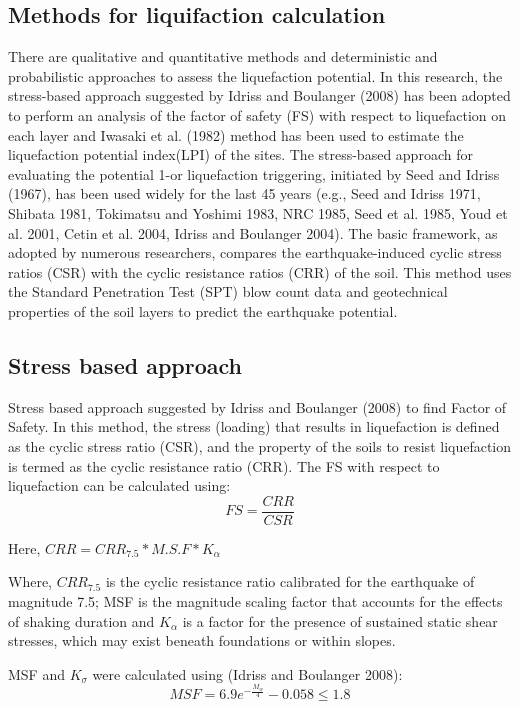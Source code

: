 \subsection{Methods for liquifaction calculation}
There are qualitative and quantitative methods and deterministic and probabilistic approaches to assess the liquefaction potential. In this research, the stress-based approach suggested by Idriss and Boulanger (2008) has been adopted to perform an analysis of the factor of safety (FS) with respect to liquefaction on each layer and Iwasaki et al. (1982) method has been used to estimate the liquefaction potential index(LPI) of the sites.
The stress-based approach for evaluating the potential 1-or liquefaction triggering, initiated by Seed and Idriss (1967), has been used widely for the last 45 years (e.g., Seed and Idriss 1971, Shibata 1981, Tokimatsu and Yoshimi 1983, NRC 1985, Seed et al. 1985, Youd et al. 2001, Cetin et al. 2004, Idriss and Boulanger 2004). The basic framework, as adopted by numerous researchers, compares the earthquake-induced cyclic stress ratios (CSR) with the cyclic resistance ratios (CRR) of the soil. This method uses the Standard Penetration Test (SPT) blow count data and geotechnical properties of the soil layers to predict the earthquake potential.
\subsection{Stress based approach}
Stress based approach suggested by Idriss and Boulanger (2008) to find Factor of Safety. In this method, the stress (loading) that results in liquefaction is defined as the cyclic stress ratio (CSR), and the property of the soils to resist liquefaction is termed as the cyclic resistance ratio (CRR). The FS with respect to liquefaction can be calculated using:
\begin{equation}
FS = \frac{CRR}{CSR}
\end{equation}

Here, $CRR = CRR_{7.5}*M.S.F*K_\alpha $

Where, $CRR_{7.5}$ is the cyclic resistance ratio calibrated for the earthquake of magnitude 7.5; MSF is the magnitude scaling factor that accounts for the effects of shaking duration and $K_\alpha$ is a factor for the presence of sustained static shear stresses, which may exist beneath foundations or within slopes.

MSF and $K_\sigma$ were calculated using  (Idriss and Boulanger 2008): 
\begin{equation}
MSF = 6.9 e^{- \frac{M_w}{4}} - 0.058 \leq 1.8
\end{equation}

